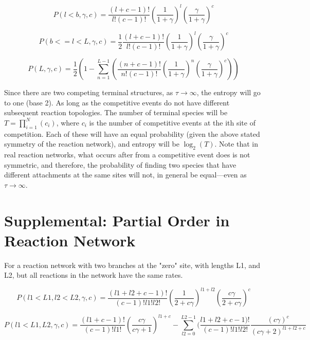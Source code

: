 \documentclass{article}
\begin{document}
\begin{equation}
P(l<b,\gamma,c)=\frac{(l+c-1)!}{l!(c-1)!}(\frac{1}{1+\gamma})^l(\frac{\gamma}{1+\gamma})^c
\end{equation}

\begin{equation}
P(b<=l<L,\gamma,c)=\frac{1}{2}\frac{(l+c-1)!}{l!(c-1)!}(\frac{1}{1+\gamma})^l(\frac{\gamma}{1+\gamma})^c
\end{equation}

\begin{equation}
P(L,\gamma,c)=\frac{1}{2}(1-\sum_{n=1}^{L-1}(\frac{(n+c-1)!}{n!(c-1)!}(\frac{1}{1+\gamma})^n(\frac{\gamma}{1+\gamma})^c))
\end{equation}


Since there are two competing terminal structures, as $\tau \rightarrow\infty$, the entropy will go to one (base 2). As long as the competitive events do not have different subsequent reaction topologies.  The number of terminal species will be $T=\prod_{i=1}^N (c_i)$, where $c_i$ is the number of competitive events at the ith site of competition. Each of these will have an equal probability (given the above stated symmetry of the reaction network), and entropy will be $\log_2(T)$. Note that in real reaction networks, what occurs after from a competitive event does is not symmetric, and therefore, the probability of finding two species that have different attachments at the same sites will not, in general be equal---even as  $\tau \rightarrow\infty$.


\section*{Supplemental: Partial Order in Reaction Network}

For a reaction network with two branches at the "zero" site, with lengths L1, and L2, but all reactions in the network have the same	 rates.

\begin{equation}
P(l1<L1,l2<L2,\gamma,c)=\frac{(l1+l2+c-1)!}{(c-1)!l1!l2!}(\frac{1}{2+c\gamma})^{l1+l2}(\frac{c\gamma}{2+c\gamma})^c
\end{equation}

\begin{equation}
P(l1<L1,L2,\gamma,c)=\frac{(l1+c-1)!}{(c-1)!l1!}(\frac{c\gamma}{c\gamma+1})^{l1+c}-\sum_{l2=0}^{L2-1}(\frac{l1+l2+c-1)!}{(c-1)!l1!l2!}\frac{(c\gamma)^c}{(c\gamma+2)^{l1+l2+c}}
\end{equation}
\end{document}
